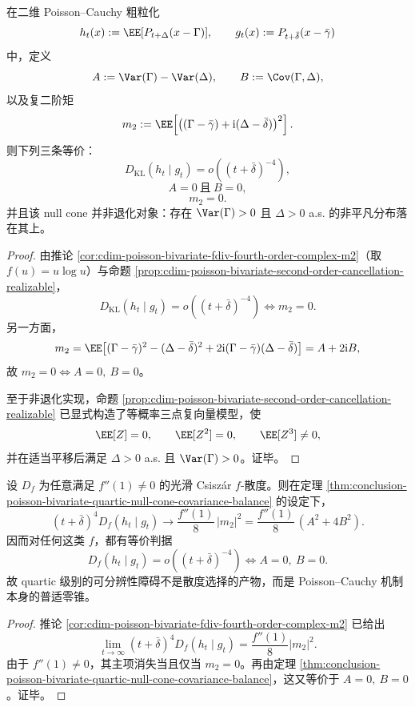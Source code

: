 \begin{theorem}\label{thm:conclusion-poisson-bivariate-quartic-null-cone-covariance-balance}
在二维 Poisson--Cauchy 粗粒化
\[
h_t(x):=\EE[P_{t+\Delta}(x-\Gamma)],
\qquad
g_t(x):=P_{t+\bar\delta}(x-\bar\gamma)
\]
中，定义
\[
A:=\Var(\Gamma)-\Var(\Delta),
\qquad
B:=\Cov(\Gamma,\Delta),
\]
以及复二阶矩
\[
m_2:=\EE\!\left[\bigl((\Gamma-\bar\gamma)+\mathrm{i}(\Delta-\bar\delta)\bigr)^2\right].
\]
则下列三条等价：
\[
D_{\mathrm{KL}}(h_t\mid g_t)=o((t+\bar\delta)^{-4}),
\]
\[
A=0\ \text{且}\ B=0,
\]
\[
m_2=0.
\]
并且该 null cone 并非退化对象：存在 \(\Var(\Gamma)>0\) 且 \(\Delta>0\) a.s. 的非平凡分布落在其上。
\end{theorem}
\begin{proof}
由推论 \ref{cor:cdim-poisson-bivariate-fdiv-fourth-order-complex-m2}（取 \(f(u)=u\log u\)）与命题 \ref{prop:cdim-poisson-bivariate-second-order-cancellation-realizable}，
\[
D_{\mathrm{KL}}(h_t\mid g_t)=o((t+\bar\delta)^{-4})
\iff
m_2=0.
\]
另一方面，
\[
m_2
=
\EE\bigl[(\Gamma-\bar\gamma)^2-(\Delta-\bar\delta)^2+2\mathrm{i}(\Gamma-\bar\gamma)(\Delta-\bar\delta)\bigr]
=
A+2\mathrm{i}B,
\]
故 \(m_2=0\iff A=0,\ B=0\)。

至于非退化实现，命题 \ref{prop:cdim-poisson-bivariate-second-order-cancellation-realizable} 已显式构造了等概率三点复向量模型，使
\[
\EE[Z]=0,\qquad \EE[Z^2]=0,\qquad \EE[Z^3]\neq 0,
\]
并在适当平移后满足 \(\Delta>0\) a.s. 且 \(\Var(\Gamma)>0\)。证毕。
\end{proof}

\begin{corollary}\label{cor:conclusion-poisson-bivariate-quartic-null-cone-fdiv-universal}
设 \(D_f\) 为任意满足 \(f''(1)\neq 0\) 的光滑 Csisz\'ar \(f\)-散度。则在定理 \ref{thm:conclusion-poisson-bivariate-quartic-null-cone-covariance-balance} 的设定下，
\[
(t+\bar\delta)^4 D_f(h_t\mid g_t)\longrightarrow \frac{f''(1)}{8}\,|m_2|^2
=
\frac{f''(1)}{8}\,(A^2+4B^2).
\]
因而对任何这类 \(f\)，都有等价判据
\[
D_f(h_t\mid g_t)=o((t+\bar\delta)^{-4})
\iff
A=0,\ B=0.
\]
故 quartic 级别的可分辨性障碍不是散度选择的产物，而是 Poisson--Cauchy 机制本身的普适零锥。
\end{corollary}
\begin{proof}
推论 \ref{cor:cdim-poisson-bivariate-fdiv-fourth-order-complex-m2} 已给出
\[
\lim_{t\to\infty}(t+\bar\delta)^4 D_f(h_t\mid g_t)=\frac{f''(1)}{8}|m_2|^2.
\]
由于 \(f''(1)\neq 0\)，其主项消失当且仅当 \(m_2=0\)。再由定理 \ref{thm:conclusion-poisson-bivariate-quartic-null-cone-covariance-balance}，这又等价于 \(A=0,\ B=0\)。证毕。
\end{proof}

